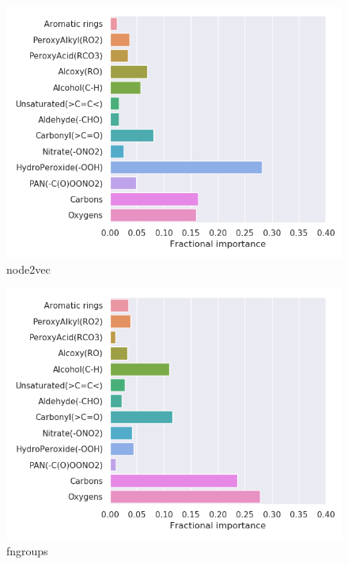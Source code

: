 \begin{subfigure}[b]{0.4\textwidth}
    \centering
    \includegraphics[width=\textwidth]{outputs/AE/node2vec/legend.png}
    \caption{node2vec}
    \label{fig:legend_AE_node2vec}
\end{subfigure}
\begin{subfigure}[b]{0.4\textwidth}
    \centering
    \includegraphics[width=\textwidth]{outputs/AE/fngroups/legend.png}
    \caption{fngroups}
    \label{fig:legend_AE_fngroups}
\end{subfigure}
